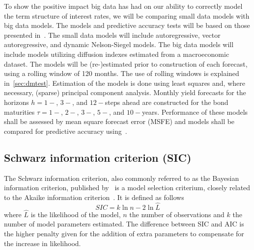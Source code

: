 To show the positive impact big data has had on our ability to correctly model the term structure of interest rates, we will be comparing small data models with big data models. 
The models and predictive accuracy tests will be based on those presented in~\textcite{Swanson2017}. 
The small data models will include autoregressive, vector autoregressive, and dynamic Nelson-Siegel models. 
The big data models will include models utilizing diffusion indexes estimated from a macroeconomic dataset. 
The models will be (re-)estimated prior to construction of each forecast, using a rolling window of 120 months. 
The use of rolling windows is explained in~\cref{sec:dmtest}. 
Estimation of the models is done using least squares and, where necessary, (sparse) principal component analysis. 
Monthly yield forecasts for the horizons $h = 1-$, $3-$, and $12-$steps ahead are constructed for the bond maturities $\tau = 1-$, $2-$, $3-$, $5-$, and $10-$years. 
Performance of these models shall be assessed by mean square forecast error (MSFE) and models shall be compared for predictive accuracy using~\textcite[hereafter DM]{Diebold1994}. 

\subsection{Schwarz information criterion (SIC)}
\label{sec:sic}
The Schwarz information criterion, also commonly referred to as the Bayesian information criterion, published by~\textcite[hereafter SIC]{Schwarz1978} is a model selection criterium, closely related to the Akaike information criterion~\parencite{Akaike1974}. 
It is defined as follows
\begin{equation}
	SIC = k\ln{n} - 2\ln{\hat{L}}
\end{equation}
where $\hat{L}$ is the likelihood of the model, $n$ the number of observations and $k$ the number of model parameters estimated. The difference between SIC and AIC is the higher penalty given for the addition of extra parameters to compensate for the increase in likelihood.

